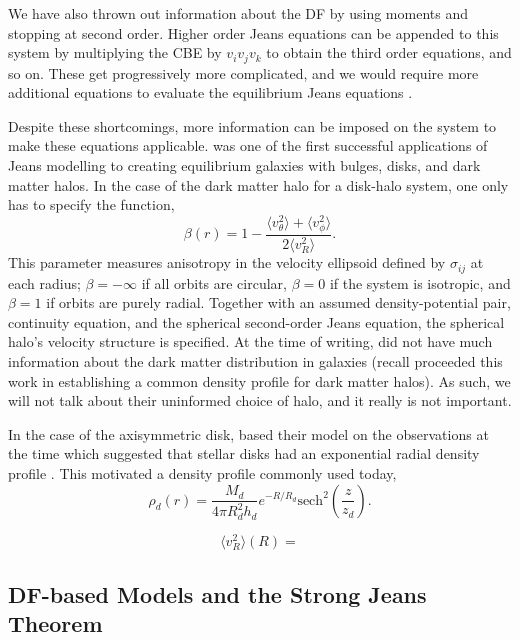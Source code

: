 We have also thrown out information about the DF by using moments and stopping at second order. Higher order Jeans equations can be appended to this system by multiplying the CBE by $v_i v_j v_k$ to obtain the third order equations, and so on. These get progressively more complicated, and we would require more additional equations to evaluate the equilibrium Jeans equations \citep{BT}.

Despite these shortcomings, more information can be imposed on the system to make these equations applicable. \citet{hernquist_1993} was one of the first successful applications of Jeans modelling to creating equilibrium galaxies with bulges, disks, and dark matter halos. In the case of the dark matter halo for a disk-halo system, one only has to specify the function,
\begin{equation}
\beta(r) = 1 - \frac{\langle v_\theta^2\rangle + \langle v_\phi^2 \rangle}{2 \langle v_R^2 \rangle}.
\end{equation}
This parameter measures anisotropy in the velocity ellipsoid defined by $\sigma_{ij}$ at each radius; $\beta = -\infty$ if all orbits are circular, $\beta=0$ if the system is isotropic, and $\beta = 1$ if orbits are purely radial. Together with an assumed density-potential pair, continuity equation, and the spherical second-order Jeans equation, the spherical halo's velocity structure is specified. At the time of writing, \citet{hernquist_1993} did not have much information about the dark matter distribution in galaxies (recall \citep{nfw} proceeded this work in establishing a common density profile for dark matter halos). As such, we will not talk about their uninformed choice of halo, and it really is not important.

In the case of the axisymmetric disk, \citet{hernquist_1993} based their model on the observations at the time which suggested that stellar disks had an exponential radial density profile \citep{freeman_1970}. This motivated a density profile commonly used today,
\begin{equation}
\rho_d(r) = \frac{M_d}{4 \pi R_d^2 h_d} e^{-R/R_d} \text{sech}^2\left(\frac{z}{z_d} \right). 
\end{equation}


\begin{equation}
\langle v_R^2 \rangle(R) = 
\end{equation}
\subsection{DF-based Models and the Strong Jeans Theorem}

